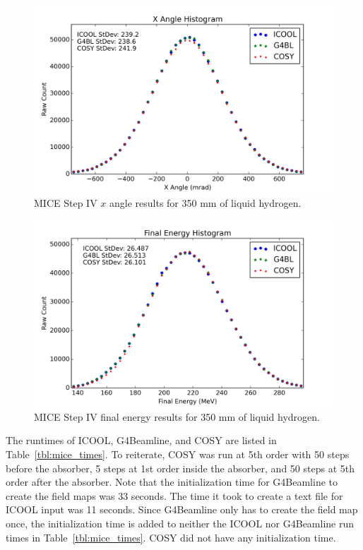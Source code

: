 \begin{figure}[H]
  \centering
    \includegraphics[width=\textwidth]{MICE data/px} 
  \caption{MICE Step IV $x$ angle results for 350 mm of liquid hydrogen.}
  \label{fig:micexangle}
\end{figure}

\begin{figure}[H]
  \centering
    \includegraphics[width=\textwidth]{MICE data/e} 
  \caption{MICE Step IV final energy results for 350 mm of liquid hydrogen.}
  \label{fig:miceenergy}
\end{figure}

The runtimes of ICOOL, G4Beamline, and COSY are listed in Table~\ref{tbl:mice_times}. To reiterate, COSY was run at 5th order with 50 steps before the absorber, 5 steps at 1st order inside the absorber, and 50 steps at 5th order after the absorber. Note that the initialization time for G4Beamline to create the field maps was 33 seconds. The time it took to create a text file for ICOOL input was 11 seconds. Since G4Beamline only has to create the field map once, the initialization time is added to neither the ICOOL nor G4Beamline run times in Table~\ref{tbl:mice_times}. COSY did not have any initialization time.


